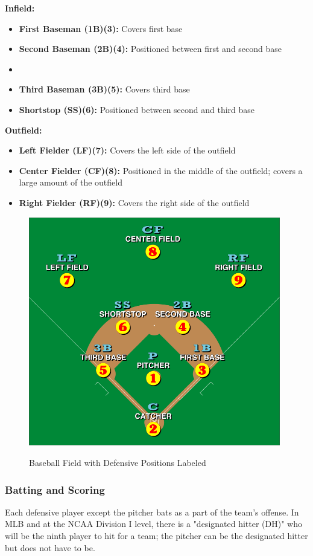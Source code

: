 \documentclass{article}
\begin{document}
\textbf{Infield:}
\begin{itemize}
    \item \textbf{First Baseman (1B)(3):} Covers first base
    \item \textbf{Second Baseman (2B)(4):} Positioned between first and second base
    \item \item \textbf{Third Baseman (3B)(5):} Covers third base
    \item \textbf{Shortstop (SS)(6):} Positioned between second and third base
\end{itemize}

\textbf{Outfield:}
\begin{itemize}
    \item \textbf{Left Fielder (LF)(7):} Covers the left side of the outfield
    \item \textbf{Center Fielder (CF)(8):} Positioned in the middle of the outfield; covers a large amount of the outfield
    \item \textbf{Right Fielder (RF)(9):} Covers the right side of the outfield
\end{itemize}

\begin{figure}[h]
    \centering        
    \includegraphics[height=10cm]{images/Baseball_positions.svg.png}
    \caption{Baseball Field with Defensive Positions Labeled}
    \cite{wikipedia2023baseballpositions}
\end{figure}
\vspace{3cm}
\newpage

\subsubsection{Batting and Scoring} 
Each defensive player except the pitcher bats as a part of the team's offense. In MLB and at the NCAA Division I level, there is a "designated hitter (DH)" who will be the ninth player to hit for a team; the pitcher can be the designated hitter but does not have to be. 
\end{document}

